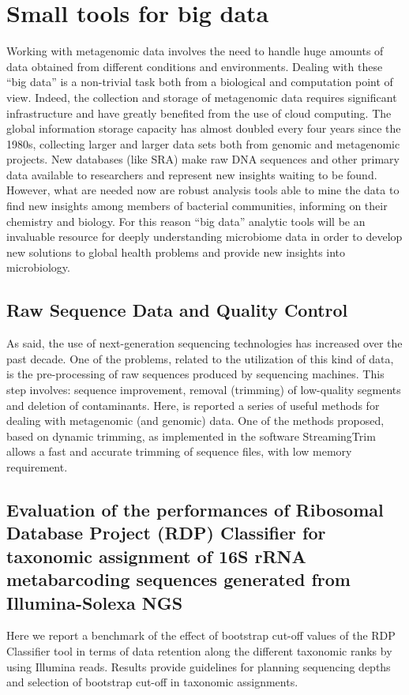 \logvartrue
\chapter{Small tools for big data}
Working with metagenomic data involves the need to handle huge amounts of data obtained from different conditions and environments. Dealing with these ``big data'' is a non-trivial task both from a biological and computation point of view. Indeed, the collection and storage of metagenomic data requires significant infrastructure and have greatly benefited from the use of cloud computing. The global information storage capacity has almost doubled every four years since the 1980s, collecting larger and larger data sets both from genomic and metagenomic projects. New databases (like SRA) make raw DNA sequences and other primary data available to researchers and represent new insights waiting to be found. However, what are needed now are robust analysis tools able to mine the data to find new insights among members of bacterial communities, informing on their chemistry and biology. For this reason ``big data'' analytic tools will be an invaluable resource for deeply understanding microbiome data in order to develop new solutions to global health problems and provide new insights into microbiology.\\


\section{Raw Sequence Data and Quality Control}
As said, the use of next-generation sequencing technologies has increased over the past decade. One of the problems, related to the utilization of this kind of data, is the pre-processing of raw sequences produced by sequencing machines. This step involves: sequence improvement, removal (trimming) of low-quality segments and deletion of contaminants. Here, is reported a series of useful methods for dealing with metagenomic (and genomic) data. One of the methods proposed, based on dynamic trimming, as implemented in the software StreamingTrim allows a fast and accurate trimming of sequence files, with low memory requirement.\\
\newpage

\newpage

\section{Evaluation of the performances of Ribosomal Database Project (RDP) Classifier for taxonomic assignment of 16S rRNA metabarcoding sequences generated from Illumina-Solexa NGS}
Here we report a benchmark of the effect of bootstrap cut-off values of the RDP Classifier tool in terms of data retention along the different taxonomic ranks by using Illumina reads. Results provide guidelines for planning sequencing depths and selection of bootstrap cut-off in taxonomic assignments.\\

